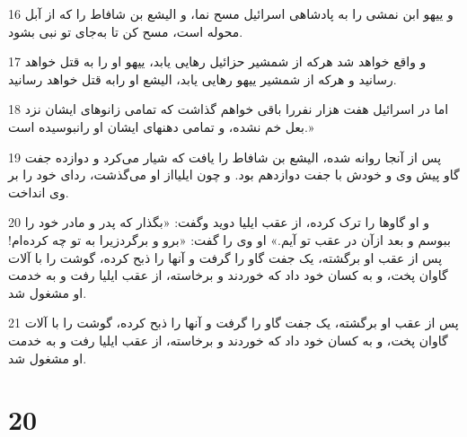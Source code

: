 \par 16 و ییهو ابن نمشی را به پادشاهی اسرائیل مسح نما، و الیشع بن شافاط را که از آبل محوله است، مسح کن تا به‌جای تو نبی بشود.
\par 17 و واقع خواهد شد هر‌که از شمشیر حزائیل رهایی یابد، ییهو او را به قتل خواهد رسانید و هرکه از شمشیر ییهو رهایی یابد، الیشع او رابه قتل خواهد رسانید.
\par 18 اما در اسرائیل هفت هزار نفررا باقی خواهم گذاشت که تمامی زانوهای ایشان نزد بعل خم نشده، و تمامی دهنهای ایشان او رانبوسیده است.»
\par 19 پس از آنجا روانه شده، الیشع بن شافاط را یافت که شیار می‌کرد و دوازده جفت گاو پیش وی و خودش با جفت دوازدهم بود. و چون ایلیااز او می‌گذشت، ردای خود را بر وی انداخت.
\par 20 و او گاوها را ترک کرده، از عقب ایلیا دوید وگفت: «بگذار که پدر و مادر خود را ببوسم و بعد ازآن در عقب تو آیم.» او وی را گفت: «برو و برگردزیرا به تو چه کرده‌ام!پس از عقب او برگشته، یک جفت گاو را گرفت و آنها را ذبح کرده، گوشت را با آلات گاوان پخت، و به کسان خود داد که خوردند و برخاسته، از عقب ایلیا رفت و به خدمت او مشغول شد.
\par 21 پس از عقب او برگشته، یک جفت گاو را گرفت و آنها را ذبح کرده، گوشت را با آلات گاوان پخت، و به کسان خود داد که خوردند و برخاسته، از عقب ایلیا رفت و به خدمت او مشغول شد.
 
\chapter{20}

